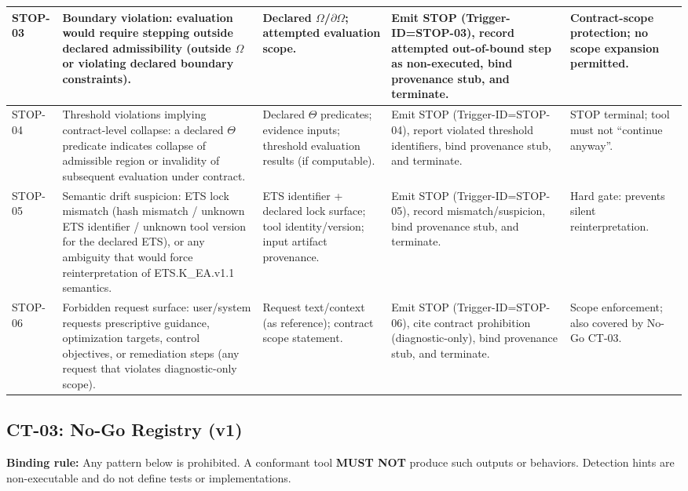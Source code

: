 \begin{longtable}{|p{1.8cm}|p{6.3cm}|p{4.1cm}|p{5.2cm}|p{3.0cm}|}
STOP-03 &
Boundary violation: evaluation would require stepping outside declared admissibility (outside $\Omega$ or violating declared boundary constraints). &
Declared $\Omega$/$\partial\Omega$; attempted evaluation scope. &
Emit STOP (Trigger-ID=STOP-03), record attempted out-of-bound step as non-executed, bind provenance stub, and terminate. &
Contract-scope protection; no scope expansion permitted. \\
\hline

STOP-04 &
Threshold violations implying contract-level collapse: a declared $\Theta$ predicate indicates collapse of admissible region or invalidity of subsequent evaluation under contract. &
Declared $\Theta$ predicates; evidence inputs; threshold evaluation results (if computable). &
Emit STOP (Trigger-ID=STOP-04), report violated threshold identifiers, bind provenance stub, and terminate. &
STOP terminal; tool must not ``continue anyway''. \\
\hline

STOP-05 &
Semantic drift suspicion: ETS lock mismatch (hash mismatch / unknown ETS identifier / unknown tool version for the declared ETS), or any ambiguity that would force reinterpretation of ETS.K\_EA.v1.1 semantics. &
ETS identifier + declared lock surface; tool identity/version; input artifact provenance. &
Emit STOP (Trigger-ID=STOP-05), record mismatch/suspicion, bind provenance stub, and terminate. &
Hard gate: prevents silent reinterpretation. \\
\hline

STOP-06 &
Forbidden request surface: user/system requests prescriptive guidance, optimization targets, control objectives, or remediation steps (any request that violates diagnostic-only scope). &
Request text/context (as reference); contract scope statement. &
Emit STOP (Trigger-ID=STOP-06), cite contract prohibition (diagnostic-only), bind provenance stub, and terminate. &
Scope enforcement; also covered by No-Go CT-03. \\
\hline

\end{longtable}
\endgroup

\subsection{CT-03: No-Go Registry (v1)}
\noindent\textbf{Binding rule:} Any pattern below is prohibited. A conformant tool \textbf{MUST NOT} produce such outputs or behaviors. Detection hints are non-executable and do not define tests or implementations.

